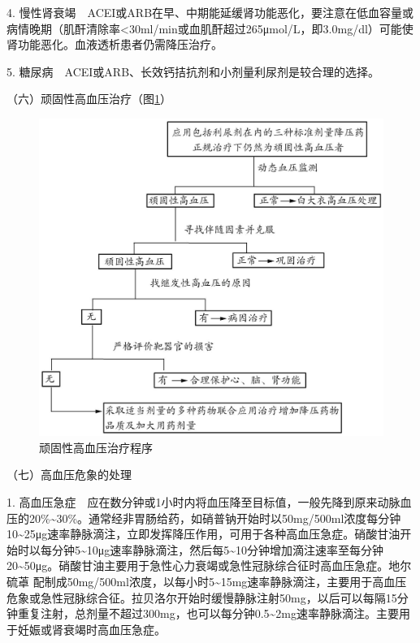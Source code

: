 4.
慢性肾衰竭　ACEI或ARB在早、中期能延缓肾功能恶化，要注意在低血容量或病情晚期（肌酐清除率\textless{}30ml/min或血肌酐超过265μmol/L，即3.0mg/dl）可能使肾功能恶化。血液透析患者仍需降压治疗。

5. 糖尿病　ACEI或ARB、长效钙拮抗剂和小剂量利尿剂是较合理的选择。

{（六）顽固性高血压治疗（图\ref{fig2-7-1}）}

\begin{figure}[!htbp]
 \centering
 \includegraphics{./images/Image00074.jpg}
 \captionsetup{justification=centering}
 \caption{顽固性高血压治疗程序}
 \label{fig2-7-1}
  \end{figure} 

{（七）高血压危象的处理}

1.
高血压急症　应在数分钟或1小时内将血压降至目标值，一般先降到原来动脉血压的20\%\textasciitilde{}30\%。通常经非胃肠给药，如硝普钠开始时以50mg/500ml浓度每分钟10\textasciitilde{}25μg速率静脉滴注，立即发挥降压作用，可用于各种高血压急症。硝酸甘油开始时以每分钟5\textasciitilde{}10μg速率静脉滴注，然后每5\textasciitilde{}10分钟增加滴注速率至每分钟20\textasciitilde{}50μg。硝酸甘油主要用于急性心力衰竭或急性冠脉综合征时高血压急症。地尔硫䓬
配制成50mg/500ml浓度，以每小时5\textasciitilde{}15mg速率静脉滴注，主要用于高血压危象或急性冠脉综合征。拉贝洛尔开始时缓慢静脉注射50mg，以后可以每隔15分钟重复注射，总剂量不超过300mg，也可以每分钟0.5\textasciitilde{}2mg速率静脉滴注。主要用于妊娠或肾衰竭时高血压急症。

